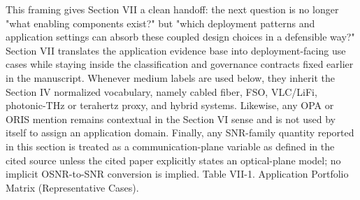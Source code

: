 {}This framing gives Section VII a clean handoff: the next question is no longer "what enabling components exist?" but "which deployment patterns and application settings can absorb these coupled design choices in a defensible way?"\markdownRendererInterblockSeparator
{}
\markdownRendererSectionEnd 
\markdownRendererSectionEnd \markdownRendererSectionBegin
{}\markdownRendererInterblockSeparator
{}Section VII translates the application evidence base into deployment-facing use cases while staying inside the classification and governance contracts fixed earlier in the manuscript. Whenever medium labels are used below, they inherit the Section IV normalized vocabulary, namely cabled fiber, FSO, VLC/LiFi, photonic-THz or terahertz proxy, and hybrid systems. Likewise, any OPA or ORIS mention remains contextual in the Section VI sense and is not used by itself to assign an application domain. Finally, any SNR-family quantity reported in this section is treated as a communication-plane variable as defined in the cited source unless the cited paper explicitly states an optical-plane model; no implicit OSNR-to-SNR conversion is implied.\markdownRendererParagraphSeparator
{}Table VII-1. Application Portfolio Matrix (Representative Cases).\markdownRendererInterblockSeparator

